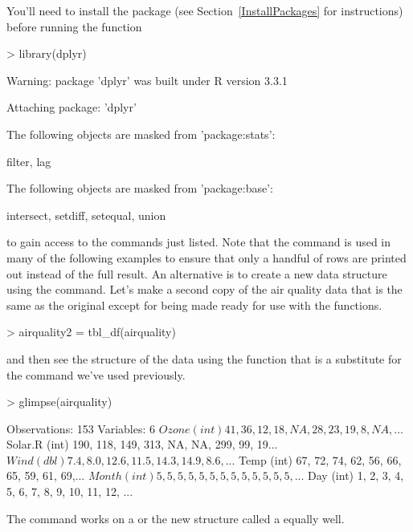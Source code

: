 You'll need to install the package (see Section~\ref{InstallPackages} for instructions) before running the function 
\begin{Schunk}
\begin{Sinput}
> library(dplyr) 
\end{Sinput}
\begin{Soutput}
Warning: package 'dplyr' was built under R version 3.3.1
\end{Soutput}
\begin{Soutput}

Attaching package: 'dplyr'
\end{Soutput}
\begin{Soutput}
The following objects are masked from 'package:stats':

    filter, lag
\end{Soutput}
\begin{Soutput}
The following objects are masked from 'package:base':

    intersect, setdiff, setequal, union
\end{Soutput}
\end{Schunk}
to gain access to the commands just listed. Note that the  command is used in many of the following examples to ensure that only a handful of rows are printed out instead of the full result. An alternative is to create a new data structure using the  command. Let's make a second copy of the air quality data that is the same as the original except for being made ready for use with the  functions. 
\begin{Schunk}
\begin{Sinput}
> airquality2 = tbl_df(airquality) 
\end{Sinput}
\end{Schunk}
and then see the structure of the data using the  function that is a substitute for the  command we've used previously. 
\begin{Schunk}
\begin{Sinput}
> glimpse(airquality) 
\end{Sinput}
\begin{Soutput}
Observations: 153
Variables: 6
$ Ozone   (int) 41, 36, 12, 18, NA, 28, 23, 19, 8, NA, ...
$ Solar.R (int) 190, 118, 149, 313, NA, NA, 299, 99, 19...
$ Wind    (dbl) 7.4, 8.0, 12.6, 11.5, 14.3, 14.9, 8.6, ...
$ Temp    (int) 67, 72, 74, 62, 56, 66, 65, 59, 61, 69,...
$ Month   (int) 5, 5, 5, 5, 5, 5, 5, 5, 5, 5, 5, 5, 5, ...
$ Day     (int) 1, 2, 3, 4, 5, 6, 7, 8, 9, 10, 11, 12, ...
\end{Soutput}
\end{Schunk}
The  command works on a  or the new structure called a  equally well. 
  
